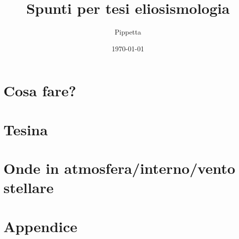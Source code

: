 \documentclass[oneside,12pt,fleqn]{memoir}
\author{Pippetta}
\title{Spunti per tesi eliosismologia}
\date{\today}
\begin{document}
\frontmatter

\maketitle

\tableofcontents*
\listoffigures

\mainmatter


\part{Cosa fare?}



\part{Tesina}








\part{Onde in atmosfera/interno/vento stellare}




\appendix
\part{Appendice}


\clearpage
{}
\printindex
\end{document}
